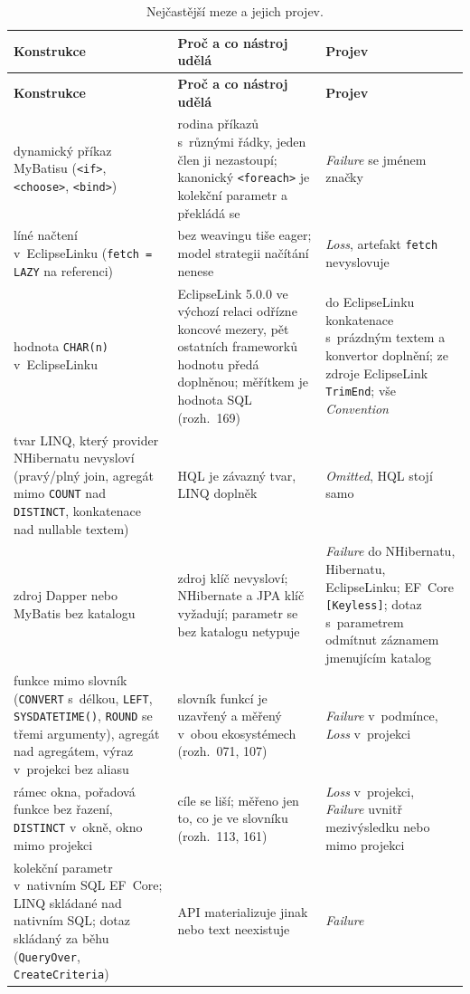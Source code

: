 \documentclass{article}
\begin{document}
{\small
\begin{longtable}{L{3.6cm} L{9.6cm} L{3.2cm}}
\caption{Nejčastější meze a jejich projev.}\label{tab:limity}\\
\toprule
\textbf{Konstrukce} & \textbf{Proč a co nástroj udělá} & \textbf{Projev} \\
\midrule
\endfirsthead
\toprule
\textbf{Konstrukce} & \textbf{Proč a co nástroj udělá} & \textbf{Projev} \\
\midrule
\endhead
\bottomrule
\endlastfoot
dynamický příkaz MyBatisu (\texttt{<if>}, \texttt{<choose>}, \texttt{<bind>}) & rodina příkazů s~různými řádky, jeden člen ji nezastoupí; kanonický \texttt{<foreach>} je kolekční parametr a překládá se & \emph{Failure} se jménem značky \\
líné načtení v~EclipseLinku (\texttt{fetch = LAZY} na referenci) & bez weavingu tiše eager; model strategii načítání nenese & \emph{Loss}, artefakt \texttt{fetch} nevyslovuje \\
hodnota \texttt{CHAR(n)} v~EclipseLinku & EclipseLink 5.0.0 ve výchozí relaci odřízne koncové mezery, pět ostatních frameworků hodnotu předá doplněnou; měřítkem je hodnota SQL (rozh.~169) & do EclipseLinku konkatenace s~prázdným textem a konvertor doplnění; ze zdroje EclipseLink \texttt{TrimEnd}; vše \emph{Convention} \\
tvar LINQ, který provider NHibernatu nevysloví (pravý/plný join, agregát mimo \texttt{COUNT} nad \texttt{DISTINCT}, konkatenace nad nullable textem) & HQL je závazný tvar, LINQ doplněk & \emph{Omitted}, HQL stojí samo \\
zdroj Dapper nebo MyBatis bez katalogu & zdroj klíč nevysloví; NHibernate a JPA klíč vyžadují; parametr se bez katalogu netypuje & \emph{Failure} do NHibernatu, Hibernatu, EclipseLinku; EF~Core \texttt{[Keyless]}; dotaz s~parametrem odmítnut záznamem jmenujícím katalog \\
funkce mimo slovník (\texttt{CONVERT} s~délkou, \texttt{LEFT}, \texttt{SYSDATETIME()}, \texttt{ROUND} se třemi argumenty), agregát nad agregátem, výraz v~projekci bez aliasu & slovník funkcí je uzavřený a měřený v~obou ekosystémech (rozh.~071, 107) & \emph{Failure} v~podmínce, \emph{Loss} v~projekci \\
rámec okna, pořadová funkce bez řazení, \texttt{DISTINCT} v~okně, okno mimo projekci & cíle se liší; měřeno jen to, co je ve slovníku (rozh.~113, 161) & \emph{Loss} v~projekci, \emph{Failure} uvnitř mezivýsledku nebo mimo projekci \\
kolekční parametr v~nativním SQL EF~Core; LINQ skládané nad nativním SQL; dotaz skládaný za běhu (\texttt{QueryOver}, \texttt{CreateCriteria}) & API materializuje jinak nebo text neexistuje & \emph{Failure} \\

\end{longtable}}
\end{document}
